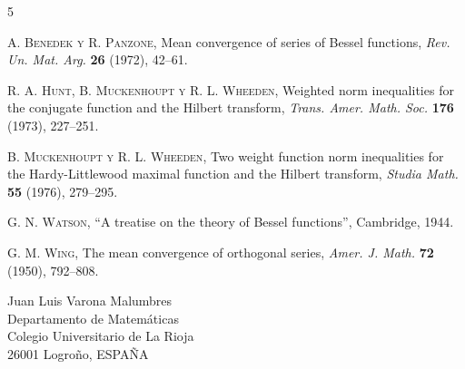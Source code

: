 \documentclass[a4paper]{article}
\begin{document}

\renewcommand{\refname}{Bibliograf\'{\i}a}

\frenchspacing

\begin{thebibliography}{5}

\textsc{A. Benedek y R. Panzone}, Mean convergence of series of 
Bessel functions, \textit{Rev. Un. Mat. Arg.} \textbf{26} (1972), 42--61.

\textsc{R. A. Hunt, B. Muckenhoupt y R. L. Wheeden}, Weighted norm 
inequalities for the conjugate function and the Hilbert transform, 
\textit{Trans. Amer. Math. Soc.} \textbf{176} (1973), 227--251.

\textsc{B. Muckenhoupt y R. L. Wheeden}, Two weight function norm 
inequalities for the Hardy-Littlewood maximal function and the 
Hilbert transform, \textit{Studia Math.} \textbf{55} (1976), 279--295.

\textsc{G. N. Watson}, ``A treatise on the theory of Bessel 
functions'', Cambridge, 1944.

\textsc{G. M. Wing}, The mean convergence of 
orthogonal series, \textit{Amer. J. Math.} \textbf{72} (1950), 792--808.

\end{thebibliography}


\bigskip
\noindent Juan Luis Varona Malumbres\\
Departamento de Matem\'aticas\\
Colegio Universitario de La Rioja\\
26001 Logro\~{n}o, ESPA\~{N}A
\end{document}
